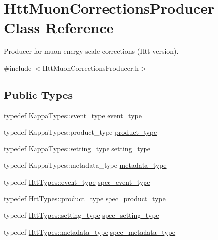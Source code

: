 \hypertarget{classHttMuonCorrectionsProducer}{
\section{HttMuonCorrectionsProducer Class Reference}
\label{classHttMuonCorrectionsProducer}
}


Producer for muon energy scale corrections (Htt version).  


{\ttfamily \#include $<$HttMuonCorrectionsProducer.h$>$}\subsection*{Public Types}
\begin{DoxyCompactItemize}
\item 
typedef KappaTypes::event\_\-type \hyperlink{classHttMuonCorrectionsProducer_af824f6024adedbe70fe035266dadf478}{event\_\-type}
\item 
typedef KappaTypes::product\_\-type \hyperlink{classHttMuonCorrectionsProducer_a3c072777f0a0774ed74f65a8b2ad9266}{product\_\-type}
\item 
typedef KappaTypes::setting\_\-type \hyperlink{classHttMuonCorrectionsProducer_a4533d535084a1cddd6040a94f5121029}{setting\_\-type}
\item 
typedef KappaTypes::metadata\_\-type \hyperlink{classHttMuonCorrectionsProducer_a476ef6cd31fb12781cc58bba7e4101b8}{metadata\_\-type}
\item 
typedef \hyperlink{classHttEvent}{HttTypes::event\_\-type} \hyperlink{classHttMuonCorrectionsProducer_a2b194859034a2861bb0e907f804d3b9a}{spec\_\-event\_\-type}
\item 
typedef \hyperlink{classHttProduct}{HttTypes::product\_\-type} \hyperlink{classHttMuonCorrectionsProducer_a5cd35af6f147de434807fe1cee0c94f3}{spec\_\-product\_\-type}
\item 
typedef \hyperlink{classHttSettings}{HttTypes::setting\_\-type} \hyperlink{classHttMuonCorrectionsProducer_a195b7a51208446ecf4de6c4df71d4312}{spec\_\-setting\_\-type}
\item 
typedef \hyperlink{classHttMetadata}{HttTypes::metadata\_\-type} \hyperlink{classHttMuonCorrectionsProducer_a630925269a247d74e4fb82cb6f3c4e16}{spec\_\-metadata\_\-type}
\end{DoxyCompactItemize}
